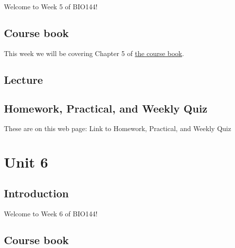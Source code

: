\documentclass[
  letterpaper,
  8pt,
  a4paper]{book}
\begin{document}
Welcome to Week 5 of BIO144!

\section*{Course book}\label{course-book-4}


This week we will be covering Chapter 5 of
\href{https://opetchey.github.io/BIO144_Course_Book/}{the course book}.

\section*{Lecture}\label{lecture-4}


\section*{Homework, Practical, and Weekly
Quiz}\label{homework-practical-and-weekly-quiz-4}


These are on this web page: Link to Homework, Practical, and Weekly Quiz


\chapter*{Unit 6}\label{unit-6}


\section*{Introduction}\label{introduction-6}


Welcome to Week 6 of BIO144!

\section*{Course book}\label{course-book-5}
\end{document}
